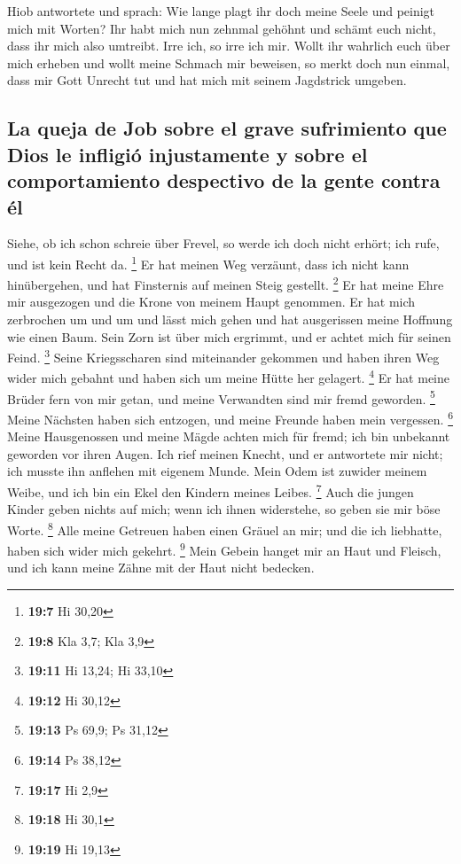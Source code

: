  Hiob antwortete und sprach:  Wie lange
plagt ihr doch meine Seele und peinigt mich mit Worten? 
Ihr habt mich nun zehnmal gehöhnt und schämt euch nicht, dass ihr mich
also umtreibt.  Irre ich, so irre ich mir. 
Wollt ihr wahrlich euch über mich erheben und wollt meine Schmach mir
beweisen,  so merkt doch nun einmal, dass mir Gott Unrecht
tut und hat mich mit seinem Jagdstrick umgeben.

\hypertarget{la-queja-de-job-sobre-el-grave-sufrimiento-que-dios-le-infligiuxf3-injustamente-y-sobre-el-comportamiento-despectivo-de-la-gente-contra-uxe9l}{%
\subsection{La queja de Job sobre el grave sufrimiento que Dios le
infligió injustamente y sobre el comportamiento despectivo de la gente
contra
él}\label{la-queja-de-job-sobre-el-grave-sufrimiento-que-dios-le-infligiuxf3-injustamente-y-sobre-el-comportamiento-despectivo-de-la-gente-contra-uxe9l}}

 Siehe, ob ich schon schreie über Frevel, so werde ich
doch nicht erhört; ich rufe, und ist kein Recht da. \footnote{\textbf{19:7}
  Hi 30,20}  Er hat meinen Weg verzäunt, dass ich nicht
kann hinübergehen, und hat Finsternis auf meinen Steig gestellt.
\footnote{\textbf{19:8} Kla 3,7; Kla 3,9}  Er hat meine
Ehre mir ausgezogen und die Krone von meinem Haupt genommen.
 Er hat mich zerbrochen um und um und lässt mich gehen
und hat ausgerissen meine Hoffnung wie einen Baum.  Sein
Zorn ist über mich ergrimmt, und er achtet mich für seinen Feind.
\footnote{\textbf{19:11} Hi 13,24; Hi 33,10}  Seine
Kriegsscharen sind miteinander gekommen und haben ihren Weg wider mich
gebahnt und haben sich um meine Hütte her gelagert. \footnote{\textbf{19:12}
  Hi 30,12}  Er hat meine Brüder fern von mir getan, und
meine Verwandten sind mir fremd geworden. \footnote{\textbf{19:13} Ps
  69,9; Ps 31,12}  Meine Nächsten haben sich entzogen,
und meine Freunde haben mein vergessen. \footnote{\textbf{19:14} Ps
  38,12}  Meine Hausgenossen und meine Mägde achten mich
für fremd; ich bin unbekannt geworden vor ihren Augen. 
Ich rief meinen Knecht, und er antwortete mir nicht; ich musste ihn
anflehen mit eigenem Munde.  Mein Odem ist zuwider meinem
Weibe, und ich bin ein Ekel den Kindern meines Leibes. \footnote{\textbf{19:17}
  Hi 2,9}  Auch die jungen Kinder geben nichts auf mich;
wenn ich ihnen widerstehe, so geben sie mir böse Worte. \footnote{\textbf{19:18}
  Hi 30,1}  Alle meine Getreuen haben einen Gräuel an
mir; und die ich liebhatte, haben sich wider mich gekehrt. \footnote{\textbf{19:19}
  Hi 19,13}  Mein Gebein hanget mir an Haut und Fleisch,
und ich kann meine Zähne mit der Haut nicht bedecken.


